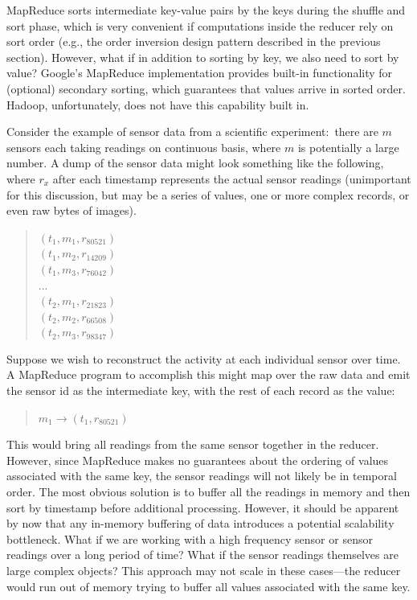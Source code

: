 MapReduce sorts intermediate key-value pairs by the keys during the
shuffle and sort phase, which is very convenient if computations
inside the reducer rely on sort order (e.g., the order inversion
design pattern described in the previous section).  However, what if
in addition to sorting by key, we also need to sort by value?
Google's MapReduce implementation provides built-in functionality for
(optional) secondary sorting, which guarantees that values arrive in
sorted order.  Hadoop, unfortunately, does not have this capability
built in.

Consider the example of sensor data from a scientific
experiment:\ there are $m$ sensors each taking readings on continuous
basis, where $m$ is potentially a large number.  A dump of the sensor
data might look something like the following, where $r_x$ after
each timestamp represents the actual sensor readings (unimportant for
this discussion, but may be a series of values, one or more complex
records, or even raw bytes of images).

\begin{quote}
$(t_1, m_1, r_{80521})$\\
$(t_1, m_2, r_{14209})$\\
$(t_1, m_3, r_{76042})$\\
$...$\\
$(t_2, m_1, r_{21823})$\\
$(t_2, m_2, r_{66508})$\\
$(t_2, m_3, r_{98347})$
\end{quote}

\noindent Suppose we wish to reconstruct the activity at each
individual sensor over time.  A MapReduce program to accomplish this
might map over the raw data and emit the sensor id as the intermediate
key, with the rest of each record as the value:

\begin{quote}
$m_1 \rightarrow (t_1, r_{80521})$
\end{quote}

\noindent This would bring all readings from the same sensor together
in the reducer.  However, since MapReduce makes no guarantees about
the ordering of values associated with the same key, the sensor
readings will not likely be in temporal order.  The most obvious
solution is to buffer all the readings in memory and then sort by
timestamp before additional processing.  However, it should be
apparent by now that any in-memory buffering of data introduces a
potential scalability bottleneck.  What if we are working with a high
frequency sensor or sensor readings over a long period of time?  What
if the sensor readings themselves are large complex objects?  This
approach may not scale in these cases---the reducer would run out of
memory trying to buffer all values associated with the same key.

